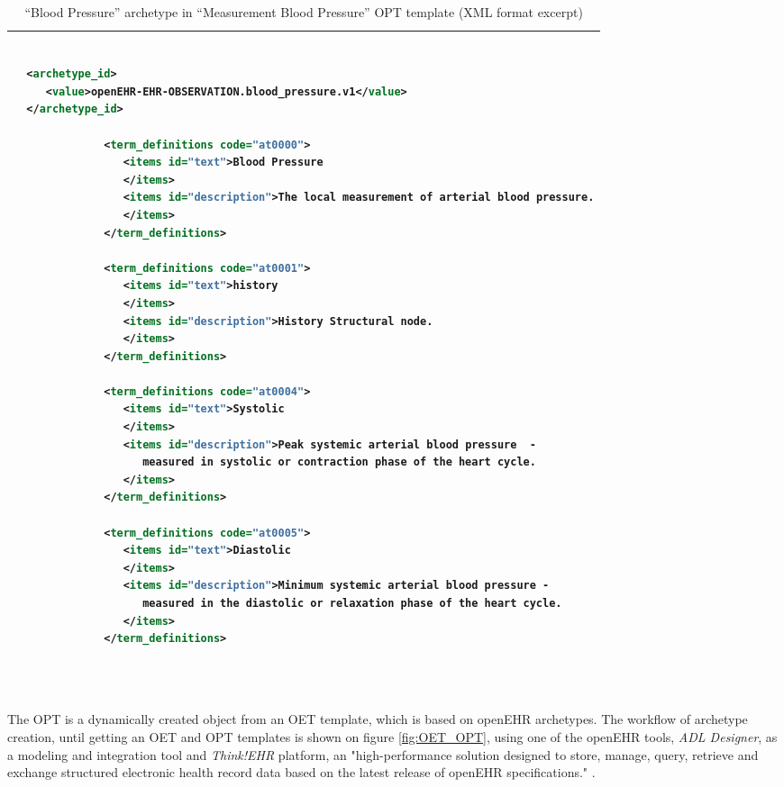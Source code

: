 \documentclass[mim_thesis.tex]{subfiles}
\begin{document}
\begin{table}[H]
	\centering
\caption{“Blood Pressure” archetype in “Measurement Blood Pressure” OPT template (XML format excerpt)}
\label{tab:bp_opt}
\begin{tabular}{l}
\toprule[2pt]
\begin{lstlisting}[language=XML]

  <archetype_id>
     <value>openEHR-EHR-OBSERVATION.blood_pressure.v1</value>
  </archetype_id>
  
              <term_definitions code="at0000">
                 <items id="text">Blood Pressure
                 </items>
                 <items id="description">The local measurement of arterial blood pressure.
                 </items>
              </term_definitions>
              
              <term_definitions code="at0001">
                 <items id="text">history
                 </items>
                 <items id="description">History Structural node.
                 </items>
              </term_definitions>
              
              <term_definitions code="at0004">
                 <items id="text">Systolic
                 </items>
                 <items id="description">Peak systemic arterial blood pressure  - 
                 	measured in systolic or contraction phase of the heart cycle.
                 </items>
              </term_definitions>
              
              <term_definitions code="at0005">
                 <items id="text">Diastolic
                 </items>
                 <items id="description">Minimum systemic arterial blood pressure - 
                 	measured in the diastolic or relaxation phase of the heart cycle.
                 </items>
              </term_definitions>
              
              
\end{lstlisting}
\tabularnewline \bottomrule[2pt]
\end{tabular}
\end{table}

The OPT is a dynamically created object from an OET template, which is based on openEHR archetypes. The workflow of archetype creation, until getting an OET and OPT templates is shown on figure \ref{fig:OET_OPT}, using one of the openEHR tools, \textit{ADL Designer}, as a modeling and integration tool and \textit{Think!EHR} platform, an "high-performance solution designed to store, manage, query, retrieve and exchange structured electronic health record data based on the latest release of openEHR specifications." \citep{t!ehr}.
\end{document}
